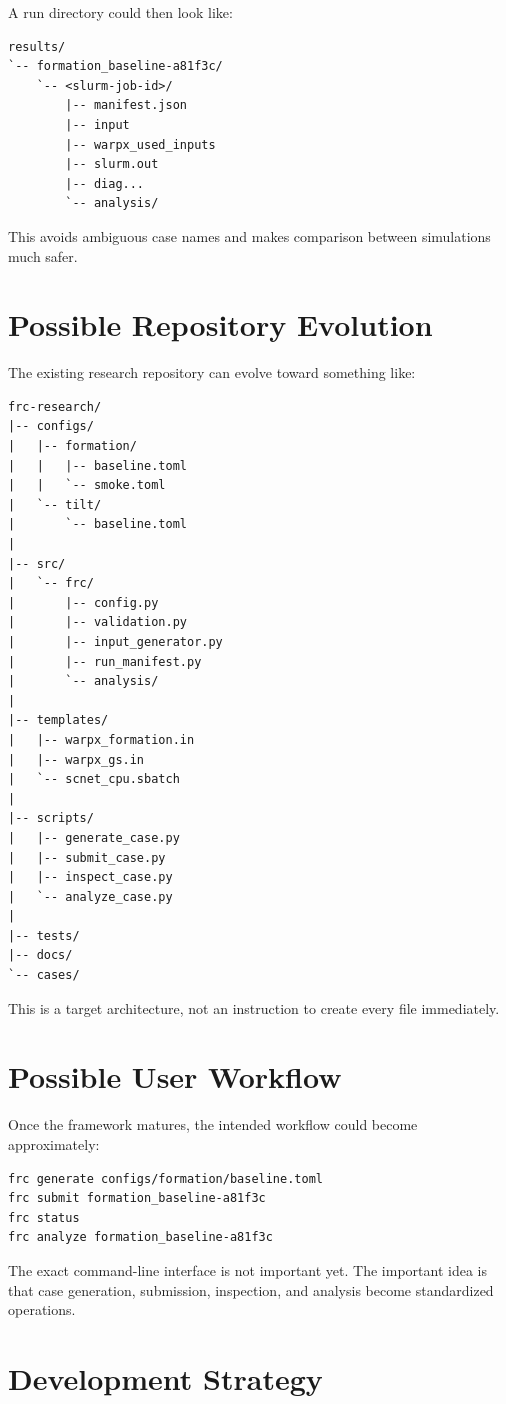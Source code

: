 \documentclass[11pt,a4paper]{article}
\begin{document}
A run directory could then look like:

\begin{lstlisting}
results/
`-- formation_baseline-a81f3c/
    `-- <slurm-job-id>/
        |-- manifest.json
        |-- input
        |-- warpx_used_inputs
        |-- slurm.out
        |-- diag...
        `-- analysis/
\end{lstlisting}

This avoids ambiguous case names and makes comparison between simulations much safer.

\section{Possible Repository Evolution}

The existing research repository can evolve toward something like:

\begin{lstlisting}
frc-research/
|-- configs/
|   |-- formation/
|   |   |-- baseline.toml
|   |   `-- smoke.toml
|   `-- tilt/
|       `-- baseline.toml
|
|-- src/
|   `-- frc/
|       |-- config.py
|       |-- validation.py
|       |-- input_generator.py
|       |-- run_manifest.py
|       `-- analysis/
|
|-- templates/
|   |-- warpx_formation.in
|   |-- warpx_gs.in
|   `-- scnet_cpu.sbatch
|
|-- scripts/
|   |-- generate_case.py
|   |-- submit_case.py
|   |-- inspect_case.py
|   `-- analyze_case.py
|
|-- tests/
|-- docs/
`-- cases/
\end{lstlisting}

This is a target architecture, not an instruction to create every file immediately.

\section{Possible User Workflow}

Once the framework matures, the intended workflow could become approximately:

\begin{lstlisting}
frc generate configs/formation/baseline.toml
frc submit formation_baseline-a81f3c
frc status
frc analyze formation_baseline-a81f3c
\end{lstlisting}

The exact command-line interface is not important yet. The important idea is that case generation, submission, inspection, and analysis become standardized operations.

\section{Development Strategy}
\end{document}
